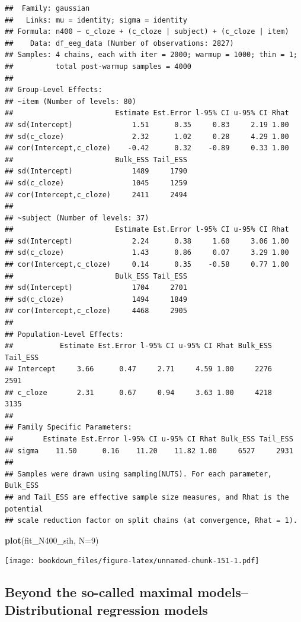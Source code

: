 \documentclass[12pt,]{krantz}
\newenvironment{Shaded}{\begin{snugshade}}{\end{snugshade}}
\newcommand{\KeywordTok}[1]{\textcolor[rgb]{0.13,0.29,0.53}{\textbf{#1}}}
\newcommand{\DataTypeTok}[1]{\textcolor[rgb]{0.13,0.29,0.53}{#1}}
\newcommand{\DecValTok}[1]{\textcolor[rgb]{0.00,0.00,0.81}{#1}}
\newcommand{\NormalTok}[1]{#1}
\theoremstyle{definition}
\theoremstyle{definition}
\theoremstyle{definition}
\theoremstyle{remark}
\begin{document}
\begin{verbatim}
##  Family: gaussian 
##   Links: mu = identity; sigma = identity 
## Formula: n400 ~ c_cloze + (c_cloze | subject) + (c_cloze | item) 
##    Data: df_eeg_data (Number of observations: 2827) 
## Samples: 4 chains, each with iter = 2000; warmup = 1000; thin = 1;
##          total post-warmup samples = 4000
## 
## Group-Level Effects: 
## ~item (Number of levels: 80) 
##                        Estimate Est.Error l-95% CI u-95% CI Rhat
## sd(Intercept)              1.51      0.35     0.83     2.19 1.00
## sd(c_cloze)                2.32      1.02     0.28     4.29 1.00
## cor(Intercept,c_cloze)    -0.42      0.32    -0.89     0.33 1.00
##                        Bulk_ESS Tail_ESS
## sd(Intercept)              1489     1790
## sd(c_cloze)                1045     1259
## cor(Intercept,c_cloze)     2411     2494
## 
## ~subject (Number of levels: 37) 
##                        Estimate Est.Error l-95% CI u-95% CI Rhat
## sd(Intercept)              2.24      0.38     1.60     3.06 1.00
## sd(c_cloze)                1.43      0.86     0.07     3.29 1.00
## cor(Intercept,c_cloze)     0.14      0.35    -0.58     0.77 1.00
##                        Bulk_ESS Tail_ESS
## sd(Intercept)              1704     2701
## sd(c_cloze)                1494     1849
## cor(Intercept,c_cloze)     4468     2905
## 
## Population-Level Effects: 
##           Estimate Est.Error l-95% CI u-95% CI Rhat Bulk_ESS Tail_ESS
## Intercept     3.66      0.47     2.71     4.59 1.00     2276     2591
## c_cloze       2.31      0.67     0.94     3.63 1.00     4218     3135
## 
## Family Specific Parameters: 
##       Estimate Est.Error l-95% CI u-95% CI Rhat Bulk_ESS Tail_ESS
## sigma    11.50      0.16    11.20    11.82 1.00     6527     2931
## 
## Samples were drawn using sampling(NUTS). For each parameter, Bulk_ESS
## and Tail_ESS are effective sample size measures, and Rhat is the potential
## scale reduction factor on split chains (at convergence, Rhat = 1).
\end{verbatim}

\begin{Shaded}
\begin{Highlighting}[]
\KeywordTok{plot}\NormalTok{(fit_N400_sih, }\DataTypeTok{N=}\DecValTok{9}\NormalTok{)}
\end{Highlighting}
\end{Shaded}

\texttt{[image: bookdown\_files/figure-latex/unnamed-chunk-151-1.pdf]}

\subsection{Beyond the so-called maximal models--Distributional
regression models}\label{sec:distrmodel}
\end{document}
